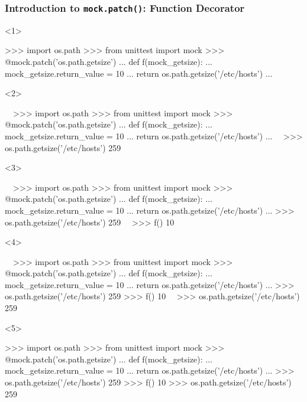 \documentclass[xcolor={svgnames}]{beamer}
\newcommand{\ttcode}[2][]{\lstinline[style=plain,basicstyle=\ttfamily#1]{#2}}
\begin{document}
\begin{frame}[t,fragile]
    \frametitle{Introduction to \ttcode{mock.patch()}: Function Decorator}
    \begin{onlyenv}<1>
        \begin{pyenv}[gobble=12]
            >>> import os.path
            >>> from unittest import mock
            >>> @mock.patch('os.path.getsize')
            ... def f(mock_getsize):
            ...     mock_getsize.return_value = 10
            ...     return os.path.getsize('/etc/hosts')
            ...
        \end{pyenv}
    \end{onlyenv}
    \begin{onlyenv}<2>
        \begin{pyenv}[gobble=12]
            ~~>>> import os.path
            >>> from unittest import mock
            >>> @mock.patch('os.path.getsize')
            ... def f(mock_getsize):
            ...     mock_getsize.return_value = 10
            ...     return os.path.getsize('/etc/hosts')
            ...~~
            >>> os.path.getsize('/etc/hosts')
            259
        \end{pyenv}
    \end{onlyenv}
    \begin{onlyenv}<3>
        \begin{pyenv}[gobble=12]
            ~~>>> import os.path
            >>> from unittest import mock
            >>> @mock.patch('os.path.getsize')
            ... def f(mock_getsize):
            ...     mock_getsize.return_value = 10
            ...     return os.path.getsize('/etc/hosts')
            ...
            >>> os.path.getsize('/etc/hosts')
            259~~
            >>> f()
            10
        \end{pyenv}
    \end{onlyenv}
    \begin{onlyenv}<4>
        \begin{pyenv}[gobble=12]
            ~~>>> import os.path
            >>> from unittest import mock
            >>> @mock.patch('os.path.getsize')
            ... def f(mock_getsize):
            ...     mock_getsize.return_value = 10
            ...     return os.path.getsize('/etc/hosts')
            ...
            >>> os.path.getsize('/etc/hosts')
            259
            >>> f()
            10~~
            >>> os.path.getsize('/etc/hosts')
            259
        \end{pyenv}
    \end{onlyenv}
    \begin{onlyenv}<5>
        \begin{pyenv}[gobble=12]
            >>> import os.path
            >>> from unittest import mock
            >>> @mock.patch('os.path.getsize')
            ... def f(mock_getsize):
            ...     mock_getsize.return_value = 10
            ...     return os.path.getsize('/etc/hosts')
            ...
            >>> os.path.getsize('/etc/hosts')
            259
            >>> f()
            10
            >>> os.path.getsize('/etc/hosts')
            259
        \end{pyenv}


\end{onlyenv}
\end{frame}
\end{document}
